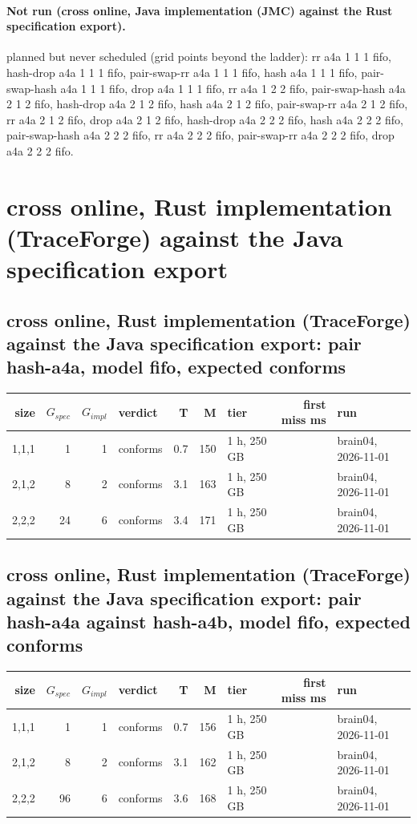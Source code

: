 \documentclass[10pt]{article}
\begin{document}
\paragraph{Not run (cross online, Java implementation (JMC) against the Rust specification export).}
planned but never scheduled (grid points beyond the ladder): rr a4a 1 1 1 fifo, hash-drop a4a 1 1 1 fifo, pair-swap-rr a4a 1 1 1 fifo, hash a4a 1 1 1 fifo, pair-swap-hash a4a 1 1 1 fifo, drop a4a 1 1 1 fifo, rr a4a 1 2 2 fifo, pair-swap-hash a4a 2 1 2 fifo, hash-drop a4a 2 1 2 fifo, hash a4a 2 1 2 fifo, pair-swap-rr a4a 2 1 2 fifo, rr a4a 2 1 2 fifo, drop a4a 2 1 2 fifo, hash-drop a4a 2 2 2 fifo, hash a4a 2 2 2 fifo, pair-swap-hash a4a 2 2 2 fifo, rr a4a 2 2 2 fifo, pair-swap-rr a4a 2 2 2 fifo, drop a4a 2 2 2 fifo.\par
\section*{cross online, Rust implementation (TraceForge) against the Java specification export}
\subsection*{cross online, Rust implementation (TraceForge) against the Java specification export: pair \textsf{hash-a4a}, model fifo, expected conforms}
\begin{longtable}{@{}rrrlrrlrl@{}}
\toprule
size & $G_{\mathit{spec}}$ & $G_{\mathit{impl}}$ & verdict & T & M & tier & first miss ms & run \\
\midrule
\endhead
\color{red} 1,1,1 & 1 & 1 & conforms & 0.7 & 150 & 1 h, 250 GB &  & brain04, 2026-11-01 \\
\color{red} 2,1,2 & 8 & 2 & conforms & 3.1 & 163 & 1 h, 250 GB &  & brain04, 2026-11-01 \\
\color{red} 2,2,2 & 24 & 6 & conforms & 3.4 & 171 & 1 h, 250 GB &  & brain04, 2026-11-01 \\
\bottomrule
\end{longtable}
\subsection*{cross online, Rust implementation (TraceForge) against the Java specification export: pair \textsf{hash-a4a} against \textsf{hash-a4b}, model fifo, expected conforms}
\begin{longtable}{@{}rrrlrrlrl@{}}
\toprule
size & $G_{\mathit{spec}}$ & $G_{\mathit{impl}}$ & verdict & T & M & tier & first miss ms & run \\
\midrule
\endhead
\color{red} 1,1,1 & 1 & 1 & conforms & 0.7 & 156 & 1 h, 250 GB &  & brain04, 2026-11-01 \\
\color{red} 2,1,2 & 8 & 2 & conforms & 3.1 & 162 & 1 h, 250 GB &  & brain04, 2026-11-01 \\
\color{red} 2,2,2 & 96 & 6 & conforms & 3.6 & 168 & 1 h, 250 GB &  & brain04, 2026-11-01 \\
\bottomrule
\end{longtable}
\end{document}
